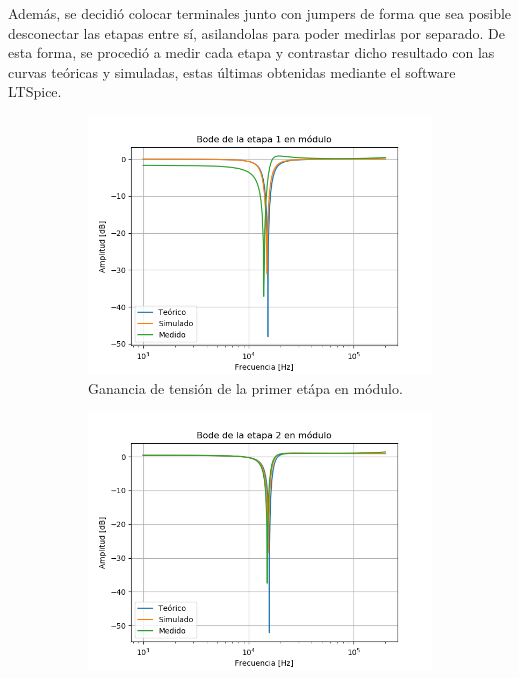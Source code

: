 Además, se decidió colocar terminales junto con jumpers de forma que sea posible desconectar las etapas entre sí, asilandolas para poder medirlas por separado. De esta forma, se procedió a medir cada etapa y contrastar dicho resultado con las curvas teóricas y simuladas, estas últimas obtenidas mediante el software LTSpice.
\begin{figure}[H]
\centering
\begin{subfigure}{.49\textwidth}
\centering
	\includegraphics[width=\textwidth]{Imagenes/Mod-1.png}
	\caption{Ganancia de tensión de la primer etápa en módulo.}
	\label{fig:mod1}
\end{subfigure}
\centering
\begin{subfigure}{.49\textwidth}
\centering
	\includegraphics[width=\textwidth]{Imagenes/Mod-2.png}

\end{subfigure}
\end{figure}
